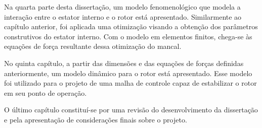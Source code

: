 Na quarta parte desta dissertação, um modelo fenomenológico que modela a interação entre o estator interno e o rotor está apresentado. Similarmente ao capítulo anterior, foi aplicada uma otimização visando a obtenção dos parâmetros construtivos do estator interno. Com o modelo em elementos finitos, chega-se às equações de força resultante dessa otimização do mancal.  

No quinta capítulo, a partir das dimensões e das equações de forças definidas anteriormente, um modelo dinâmico para o rotor está apresentado. Esse modelo foi utilizado para o projeto de uma malha de controle capaz de estabilizar o rotor em seu ponto de operação.

O último capítulo constituí-se por uma revisão do desenvolvimento da dissertação e pela apresentação de considerações finais sobre o projeto.


